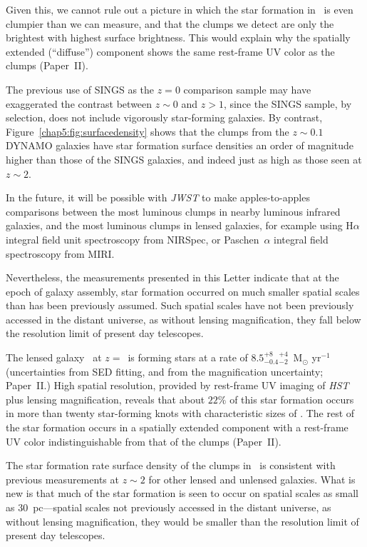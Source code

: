 Given this, we cannot rule out a picture in which the star formation in \arcname\ 
is even clumpier than we can measure, and that the clumps we detect are only the 
brightest with highest surface brightness.  This would explain why 
the spatially extended (``diffuse'') component shows the same 
rest-frame UV color as the clumps (Paper~II).

The previous use of SINGS \citep{Kennicutt:2003xq} as the 
$z=0$ comparison sample may have exaggerated 
the contrast between $z\sim0$ and $z>1$, 
since the SINGS sample, by selection, does not include vigorously star-forming galaxies. 
By contrast, Figure~\ref{chap5:fig:surfacedensity} shows that 
the clumps from the $z\sim 0.1$ DYNAMO galaxies \citep{Fisher:2017tk} 
have star formation surface densities
an order of magnitude higher than those of the SINGS galaxies, and
indeed just as high as those seen at $z \sim 2$.

In the future, it will be possible with \textit{JWST} to make apples-to-apples 
comparisons between the most luminous clumps in nearby luminous infrared galaxies, 
and the most luminous clumps in lensed galaxies, 
for example using  H$\alpha$ integral field unit spectroscopy from NIRSpec, 
or Paschen~$\alpha$ integral field spectroscopy from MIRI.

Nevertheless, the measurements presented in this Letter indicate that at the
epoch of galaxy assembly,  star formation occurred on much smaller 
spatial scales than has been previously assumed.  
Such spatial scales have not been 
previously accessed in the distant universe, as without lensing
magnification, they fall below the resolution limit of present day telescopes.

The lensed galaxy \arcname\ at $z=$\zA\  is forming stars at a rate of 
$8.5$$^{+8}_{-0.4}$$^{+4}_{-2}$~M$_{\odot}$ yr$^{-1}$ (uncertainties from SED fitting,
and from the magnification uncertainty; Paper~II.)
High spatial resolution, provided by rest-frame UV imaging of \textit{HST} plus 
lensing magnification, reveals that about  $22\%$ of this star formation occurs
in more than twenty star-forming knots with characteristic
sizes of   \rangeofscales .
The rest of the star formation occurs in a spatially extended component 
with a rest-frame UV color indistinguishable from that of the clumps
(Paper~II).

The star formation rate surface density of the clumps in \arcname\ 
is consistent with previous measurements
at $z\sim2$ for other lensed and unlensed galaxies.  What is new is that much of the 
star formation is seen to  occur on spatial scales as small as 30~pc---spatial scales not 
previously accessed in the distant universe, as without lensing
magnification, they would be smaller than the resolution limit of
present day telescopes.

